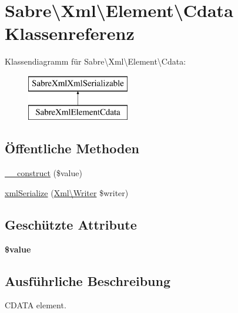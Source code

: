 \hypertarget{class_sabre_1_1_xml_1_1_element_1_1_cdata}{}\section{Sabre\textbackslash{}Xml\textbackslash{}Element\textbackslash{}Cdata Klassenreferenz}
\label{class_sabre_1_1_xml_1_1_element_1_1_cdata}
Klassendiagramm für Sabre\textbackslash{}Xml\textbackslash{}Element\textbackslash{}Cdata\+:\begin{figure}[H]
\begin{center}
\leavevmode
\includegraphics[height=2.000000cm]{class_sabre_1_1_xml_1_1_element_1_1_cdata}
\end{center}
\end{figure}
\subsection*{Öffentliche Methoden}
\begin{DoxyCompactItemize}
\item 
\mbox{\hyperlink{class_sabre_1_1_xml_1_1_element_1_1_cdata_a6a902087ca527d78a10c6d00870c35c2}{\+\_\+\+\_\+construct}} (\$value)
\item 
\mbox{\hyperlink{class_sabre_1_1_xml_1_1_element_1_1_cdata_ad0130ea08e4557560fb82b5ad3e556e9}{xml\+Serialize}} (\mbox{\hyperlink{class_sabre_1_1_xml_1_1_writer}{Xml\textbackslash{}\+Writer}} \$writer)
\end{DoxyCompactItemize}
\subsection*{Geschützte Attribute}
\begin{DoxyCompactItemize}
\item 
\mbox{\label{class_sabre_1_1_xml_1_1_element_1_1_cdata_ae78e39135b25a33cc2a08eca22e6c521}} 
{\bfseries \$value}
\end{DoxyCompactItemize}


\subsection{Ausführliche Beschreibung}
C\+D\+A\+TA element.

